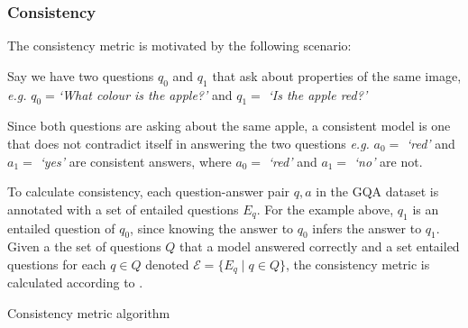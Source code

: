 \subsubsection{Consistency}

The consistency metric is motivated by the following scenario:

Say we have two questions \(q_0\) and \(q_1\) that ask about properties of the same image, \textit{e.g.} \(q_0 = \)\textit{`What colour is the apple?'} and  \(q_1 = \) \textit{`Is the apple red?'}

Since both questions are asking about the same apple, a consistent model is one that does not contradict itself in answering the two questions \textit{e.g.} \(a_0 =\) \textit{`red'} and \(a_1 =\) \textit{`yes'} are consistent answers, where \(a_0 =\) \textit{`red'} and \(a_1 =\) \textit{`no'} are not.

To calculate consistency, each question-answer pair \(q, a\) in the GQA dataset is annotated with a set of entailed questions \(E_q\). For the example above, \(q_1\) is an entailed question of \(q_0\), since knowing the answer to \(q_0\) infers the answer to \(q_1\). Given a the set of questions \(Q\) that a model answered correctly and a set entailed questions for each \(q \in Q\) denoted \(\mathcal{E} = \{E_q \mid q \in Q\}\), the consistency metric is calculated according to \algorithmcfname{ \ref{algorithm:consistency}}.

\begin{algorithm}[htbp]
    \caption[Consistency metric algorithm]{Consistency metric algorithm}
    \label{algorithm:consistency}
\end{algorithm}


